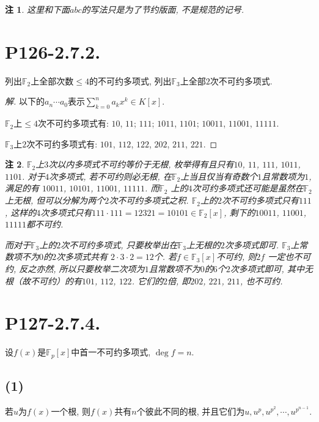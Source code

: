 \documentclass[12pt, a4paper, fontset=windows]{ctexart}
\newcommand{\F}{\mathbb{F}}
\newcommand{\kh}[1]{（{#1}）} %
\newtheorem*{remark}{注}
\newenvironment{solution}{\begin{proof}[解]}{\end{proof}}
\begin{document}
\begin{remark}
这里和下面$abc$的写法只是为了节约版面, 不是规范的记号. 
\end{remark}

\section*{P126-2.7.2.}
\label{enum-irr}

列出$\F_2$上全部次数$\le 4$的不可约多项式, 
列出$\F_3$上全部$2$次不可约多项式. 

\begin{solution}
以下的$a_n\cdots a_0$表示$\sum^n_{k=0}a_kx^k\in K[x]$. 

$\F_2$上$\le 4$次不可约多项式有: $10$, $11$; $111$; 
$1011$, $1101$; $10011$, $11001$, $11111$. 

$\F_3$上$2$次不可约多项式有: 
$101$, $112$, $122$, $202$, $211$, $221$. 
\end{solution}

\begin{remark}
$\F_2$上$3$次以内多项式不可约等价于无根, 枚举得有且只有$10$, 
$11$, $111$, $1011$, $1101$. 对于$4$次多项式, 若不可约则必无根, 
在$\F_2$上当且仅当有奇数个$1$且常数项为$1$, 满足的有
$10011$, $10101$, $11001$, $11111$. 而$\F_2$
上的$4$次可约多项式还可能是虽然在$\F_2$上无根, 
但可以分解为两个$2$次不可约多项式之积. 
$\F_2$上的$2$次不可约多项式只有$111$, 
这样的$4$次多项式只有$111\cdot 111=12321=10101\in\F_2[x]$, 
剩下的$10011$, $11001$, $11111$都不可约. 

而对于$\F_3$上的$2$次不可约多项式, 
只要枚举出在$\F_3$上无根的$2$次多项式即可. 
$\F_3$上常数项不为$0$的$2$次多项式共有
$2\cdot 3\cdot 2=12$个. 若$f\in\F_3[x]$不可约, 则$2f$
一定也不可约, 反之亦然, 
所以只要枚举二次项为$1$且常数项不为$0$的$6$个$2$次多项式即可, 
其中无根\kh{故不可约}的有$101$, $112$, $122$. 
它们的$2$倍, 即$202$, $221$, $211$, 也不可约. 
\end{remark}

\section*{P127-2.7.4.}

设$f(x)$是$\F_p[x]$中首一不可约多项式, $\deg f=n$. 

\subsection*{(1)}

若$u$为$f(x)$一个根, 则$f(x)$共有$n$个彼此不同的根, 
并且它们为$u,u^p,u^{p^2},\cdots,u^{p^{n-1}}$. 
\end{document}
